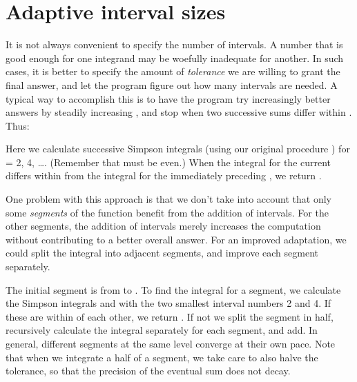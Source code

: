 \section{Adaptive interval sizes}

It is not always convenient to specify the number 
of intervals.  A number that is good enough for
one integrand may be woefully inadequate for another.  In
such cases, it is better to specify the amount of
{\it tolerance\/}  we are willing to grant the final answer, and let
the program figure out how many intervals are needed.  A
typical way to accomplish this is to have the program
try increasingly better answers by steadily increasing
, and stop when two successive sums differ within
.  Thus:


\n Here we calculate successive Simpson integrals (using
our original procedure ) for
 = 2, 4, \dots.  (Remember that  must be even.)
When the integral  for the current 
differs within  from the integral  for
the immediately preceding , we return .

One problem with this approach is that we don’t take
into account that only some {\it segments\/} of the
function benefit from the addition of intervals.  For
the other segments, the addition of intervals merely
increases the computation without contributing to a
better overall answer.  For an improved adaptation, we
could split the integral into adjacent segments, and
improve each segment separately.


\n The initial segment is from  to .  To find
the integral for a segment, we calculate the Simpson
integrals  and  with the two smallest
interval numbers 2 and 4.  If these are within  of
each other, we return .  If not we split the
segment in half, recursively calculate the integral
separately for each segment, and add.  In
general, different segments at the same level converge
at their own pace.  Note that when we integrate a half
of a segment, we take care to also halve the tolerance,
so that the precision of the eventual sum does not
decay.

